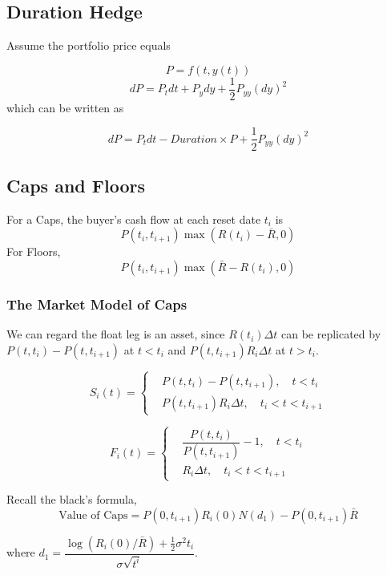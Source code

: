 \documentclass[a4]{article}
\begin{document}
\subsection{Duration Hedge}
Assume the portfolio price equals\par 
$$
P = f(t, y(t))
$$
$$
dP = P_{t}dt + P_{y}dy + \frac{1}{2}P_{yy}(dy)^{2}
$$
which can be written as\par 
$$
dP = P_{t}dt - Duration\times P + \frac{1}{2}P_{yy}(dy)^{2}
$$
\subsection{Caps and Floors}
For a Caps, the buyer's cash flow at each reset date $t_{i}$ is 
$$
P(t_{i}, t_{i + 1})\max(R(t_{i})-\bar R,0)
$$
For Floors, 
$$
P(t_{i}, t_{i + 1})\max(\bar R - R(t_{i}), 0)
$$
\subsubsection{The Market Model of Caps}
We can regard the float leg is an asset, since $R(t_{i})\Delta t$ can be replicated by $P(t, t_{i}) - P(t, t_{i + 1})$ at $t<t_{i}$ and $P(t, t_{i+1})R_{i}\Delta t$ at $t>t_{i}$.\par 
$$
S_{i}(t) = \left\{\begin{aligned}
&P(t, t_{i}) - P(t, t_{i+1}), \quad t<t_{i}\\
&P(t, t_{i+1})R_{i}\Delta t, \quad t_{i}<t<t_{i+1}
\end{aligned}\right.
$$\par 
$$
F_{i}(t) = \left\{\begin{aligned}
&\dfrac{P(t, t_{i})}{P(t, t_{i+1})} - 1, \quad t<t_{i}\\
&R_{i}\Delta t, \quad t_{i}<t<t_{i+1}
\end{aligned}\right.
$$\par 
Recall the black's formula,
$$
\text{Value of Caps} = P(0, t_{i+1})R_{i}(0)N(d_{1}) - P(0, t_{i+1})\bar R
$$\par 
where $d_{1} = \dfrac{\log(R_{i}(0)/\bar R) + \frac{1}{2}\sigma^{2}t_{i}}{\sigma \sqrt{t^{i}}}$.
\end{document}

